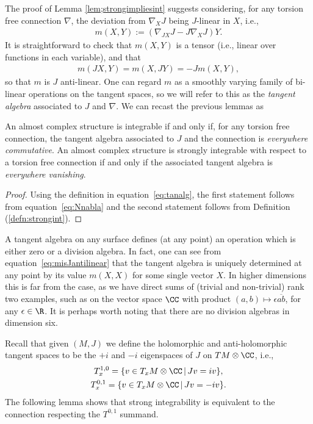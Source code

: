 The proof of Lemma \ref{lem;strongimpliesint} suggests considering, for any torsion free connection $\nabla$, the deviation from $\nabla_X J$ being $J$-linear in $X$, i.e.,
\begin{gather} \label{eq:tanalg}
m(X,Y) := ( \nabla_{JX} J - J \nabla_X J ) Y.
\end{gather}
It is straightforward to check that $m(X,Y)$ is a tensor (i.e., linear over functions in each variable), and that
\begin{gather} \label{eq:misJantilinear}
m(JX,Y) = m(X,JY) = - J m(X,Y),
\end{gather}
so that $m$ is $J$ anti-linear. One can regard $m$ as a smoothly varying family of bi-linear operations on the tangent spaces, so we will refer to this as the \emph{tangent algebra} associated to $J$ and $\nabla$.
We can recast the previous lemmas as

\begin{cor} \label{cor:Jintcomm}
 An almost complex structure is integrable if and only if, for any torsion free connection, the tangent algebra associated to $J$ and the connection is \emph{everywhere commutative}. An almost complex structure is strongly integrable with respect to a torsion free connection if and only if the associated tangent algebra is \emph{everywhere vanishing}.
 \end{cor}

 \begin{proof}Using the definition in equation~\eqref{eq:tanalg}, the first statement follows from equation~\eqref{eq:Nnabla} and the second
statement follows from Definition (\ref{defn:strongint}).
 \end{proof}

\begin{rmk}A tangent algebra on any surface defines (at any point) an operation which is either zero or a division algebra. In fact, one can see from equation~\eqref{eq:misJantilinear} that the tangent algebra is uniquely determined at any point by its value $m(X,X)$ for some single vector $X$. In higher dimensions this is far from the case, as we have direct sums of (trivial and non-trivial) rank two examples, such as on the vector space $\CC$ with product $(a,b) \mapsto \epsilon \overline{ab}$, for any $\epsilon \in \R$. It is perhaps worth noting that there are no division algebras in dimension six.
\end{rmk}

Recall that given $(M,J)$ we define the holomorphic and anti-holomorphic tangent spaces to be the $+i$ and $-i$ eigenspaces of $J$ on $TM \otimes \CC$, i.e.,
\begin{gather*}
T^{1,0}_x = \{ v \in T_xM \otimes \CC \,| \, Jv = i v\}, \\
T^{0,1}_x = \{ v \in T_xM \otimes \CC\, | \, Jv = - i v\}.
\end{gather*}
The following lemma shows that strong integrability is equivalent to the connection respecting the $T^{0,1}$ summand.

